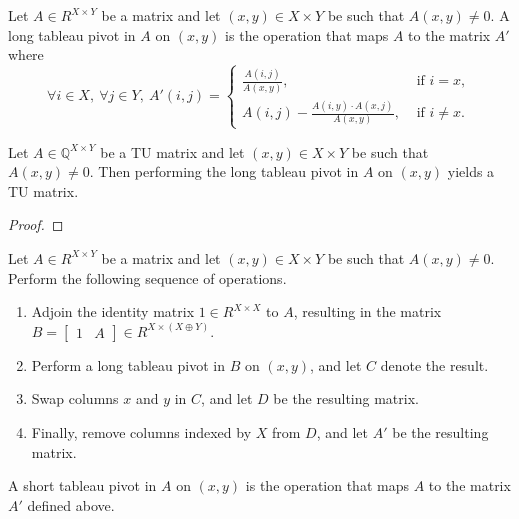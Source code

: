 \begin{definition}
    \label{Matrix.longTableauPivot}
    \leanok
    Let $A \in R^{X \times Y}$ be a matrix and let $(x, y) \in X \times Y$ be such that $A (x, y) \neq 0$. A long tableau pivot in $A$ on $(x, y)$ is the operation that maps $A$ to the matrix $A'$ where
    \[
        \forall i \in X, \ \forall j \in Y, \ A' (i, j) = \begin{cases}
            \frac{A (i, j)}{A (x, y)}, & \text{ if } i = x, \\
            A (i, j) - \frac{A (i, y) \cdot A (x, j)}{A (x, y)}, & \text{ if } i \neq x.
        \end{cases}
    \]
\end{definition}

\begin{lemma}
    \label{Matrix.IsTotallyUnimodular.longTableauPivot}
    \leanok
    Let $A \in \mathbb{Q}^{X \times Y}$ be a TU matrix and let $(x, y) \in X \times Y$ be such that $A (x, y) \neq 0$. Then performing the long tableau pivot in $A$ on $(x, y)$ yields a TU matrix.
\end{lemma}

\begin{proof}
    \leanok
    \SeeLean
\end{proof}



\begin{definition}
    \label{Matrix.shortTableauPivot}
    \leanok
    Let $A \in R^{X \times Y}$ be a matrix and let $(x, y) \in X \times Y$ be such that $A (x, y) \neq 0$. Perform the following sequence of operations.
    \begin{enumerate}
        \item Adjoin the identity matrix $1 \in R^{X \times X}$ to $A$, resulting in the matrix $B = \begin{bmatrix} 1 & A \end{bmatrix} \in R^{X \times (X \oplus Y)}$.
        \item Perform a long tableau pivot in $B$ on $(x, y)$, and let $C$ denote the result.
        \item Swap columns $x$ and $y$ in $C$, and let $D$ be the resulting matrix.
        \item Finally, remove columns indexed by $X$ from $D$, and let $A'$ be the resulting matrix.
    \end{enumerate}
    A short tableau pivot in $A$ on $(x, y)$ is the operation that maps $A$ to the matrix $A'$ defined above.
\end{definition}

